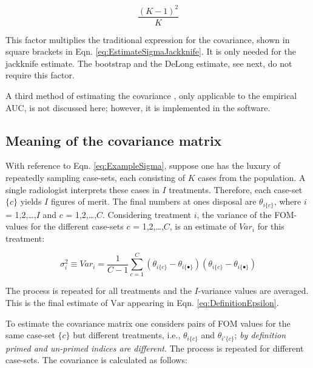 \documentclass[
]{book}
\begin{document}
\begin{equation}
\frac{(K-1)^2}{K}
\label{eq:JKVarianceInflationFactor}
\end{equation}

This factor multiplies the traditional expression for the covariance, shown in square brackets in Eqn. \eqref{eq:EstimateSigmaJackknife}. It is only needed for the jackknife estimate. The bootstrap and the DeLong estimate, see next, do not require this factor.

A third method of estimating the covariance \citep{RN112}, only applicable to the empirical AUC, is not discussed here; however, it is implemented in the software.

\hypertarget{or-method-intro-elementary-stats-meaning-cov-matrix}{%
\subsection{Meaning of the covariance matrix}\label{or-method-intro-elementary-stats-meaning-cov-matrix}}

With reference to Eqn. \eqref{eq:ExampleSigma}, suppose one has the luxury of repeatedly sampling case-sets, each consisting of \(K\) cases from the population. A single radiologist interprets these cases in \(I\) treatments. Therefore, each case-set \(\{c\}\) yields \(I\) figures of merit. The final numbers at ones disposal are \(\theta_{i\{c\}}\), where \(i\) = 1,2,\ldots,\(I\) and \(c\) = 1,2,\ldots,\(C\). Considering treatment \(i\), the variance of the FOM-values for the different case-sets \(c\) = 1,2,\ldots,\(C\), is an estimate of \(Var_i\) for this treatment:

\begin{equation}
\sigma_i^2 \equiv Var_i = \frac{1}{C-1}\sum_{c=1}^{C}\left ( \theta_{i\{c\}} - \theta_{i\{\bullet\}} \right) \left ( \theta_{i\{c\}} - \theta_{i\{\bullet\}} \right)
\label{eq:EstimateVari}
\end{equation}

The process is repeated for all treatments and the \(I\)-variance values are averaged. This is the final estimate of \(\text{Var}\) appearing in Eqn. \eqref{eq:DefinitionEpsilon}.

To estimate the covariance matrix one considers pairs of FOM values for the same case-set \(\{c\}\) but different treatments, i.e., \(\theta_{i\{c\}}\) and \(\theta_{i'\{c\}}\); \emph{by definition primed and un-primed indices are different}. The process is repeated for different case-sets. The covariance is calculated as follows:
\end{document}
